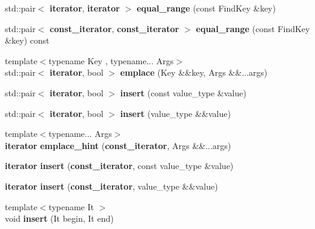 \begin{DoxyCompactItemize}
\item 
std\+::pair$<$ {\bf iterator}, {\bf iterator} $>$ {\bfseries equal\+\_\+range} (const Find\+Key \&key)\label{classska_1_1detailv3_1_1sherwood__v3__table_a3b64e1e928246b3c288b99416d8a7bc3}

\item 
std\+::pair$<$ {\bf const\+\_\+iterator}, {\bf const\+\_\+iterator} $>$ {\bfseries equal\+\_\+range} (const Find\+Key \&key) const \label{classska_1_1detailv3_1_1sherwood__v3__table_aa0742f22c59133513a73edae201d259d}

\item 
{\footnotesize template$<$typename Key , typename... Args$>$ }\\std\+::pair$<$ {\bf iterator}, bool $>$ {\bfseries emplace} (Key \&\&key, Args \&\&...args)\label{classska_1_1detailv3_1_1sherwood__v3__table_a200bc6efadde1c702d43cc409fb19429}

\item 
std\+::pair$<$ {\bf iterator}, bool $>$ {\bfseries insert} (const value\+\_\+type \&value)\label{classska_1_1detailv3_1_1sherwood__v3__table_a60fe276e2e28f1f3a511eaa833cac0ba}

\item 
std\+::pair$<$ {\bf iterator}, bool $>$ {\bfseries insert} (value\+\_\+type \&\&value)\label{classska_1_1detailv3_1_1sherwood__v3__table_a67bfc4de7f7c1ba543663521cdf4b3cb}

\item 
{\footnotesize template$<$typename... Args$>$ }\\{\bf iterator} {\bfseries emplace\+\_\+hint} ({\bf const\+\_\+iterator}, Args \&\&...args)\label{classska_1_1detailv3_1_1sherwood__v3__table_a62aee80e9a17d2ef7e79ca7ac0ca1136}

\item 
{\bf iterator} {\bfseries insert} ({\bf const\+\_\+iterator}, const value\+\_\+type \&value)\label{classska_1_1detailv3_1_1sherwood__v3__table_a8aa6f8b14b1c79e18f9a3d913c626cc7}

\item 
{\bf iterator} {\bfseries insert} ({\bf const\+\_\+iterator}, value\+\_\+type \&\&value)\label{classska_1_1detailv3_1_1sherwood__v3__table_a7155ae2aec75f222c07fb6331a7c7b24}

\item 
{\footnotesize template$<$typename It $>$ }\\void {\bfseries insert} (It begin, It end)\label{classska_1_1detailv3_1_1sherwood__v3__table_ae2e98b3ce956b3457faea3a03171ae5f}


\end{DoxyCompactItemize}

